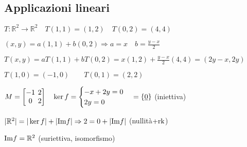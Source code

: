 \subsection{Applicazioni lineari}
$T: \mathbb{R}^2 \rightarrow \mathbb{R}^2 \quad T(1,1) = (1,2) \quad T(0,2) = (4,4)$

$(x,y) = a(1,1) + b(0,2) \Rightarrow a = x \quad b = \frac{y-x}{2}$

$T(x,y) = aT(1,1) + bT(0,2) = x(1,2) + \frac{y-x}{2}(4,4) = (2y-x, 2y)$

$T(1,0) = (-1,0) \qquad T(0,1) = (2,2)$

$M = \left[
	\arraycolsep=2.0pt\def\arraystretch{1.0}
	\begin{array}{@{}cc@{}}
		-1 & 2 \\
		0 & 2 \\
	\end{array}
\right]
\quad
\ker f = \begin{cases}
	-x +2y = 0 \\
	2y = 0 \\
\end{cases}
= \{\vec{0}\}
$ (iniettiva)

$|\mathbb{R}^2| = |\ker f| + |\mathrm{Im} f| \Rightarrow 2 = 0 + |\mathrm{Im} f|$ (nullità$+\mathrm{rk}$)

$\mathrm{Im} f = \mathbb{R}^2$ (suriettiva, isomorfismo)
